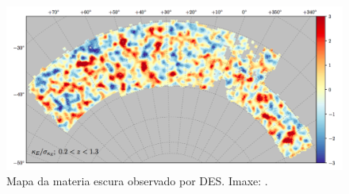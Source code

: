 \documentclass{article}
\begin{document}
\begin{figure}[h]
\includegraphics[width=\textwidth]{Y1-massmap}
\caption{Mapa da materia escura observado por DES. Imaxe: \cite{chang}.
\label{fig:massmap}
}
\end{figure}



\end{document}
